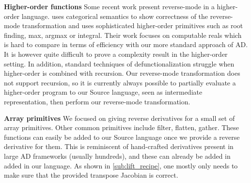 

\noindent \textbf{Higher-order functions}
Some recent work \cite{vakar2020reverse,sherman2021} present reverse-mode in a higher-order language.
\cite{vakar2020reverse} uses categorical semantics to show correctness of the reverse-mode transformation 
and \cite{sherman2021} uses sophisticated higher-order primitives such as root finding, max, argmax or integral. 
Their work focuses on computable reals which is hard to compare in terms of efficiency with our more standard approach of AD.
It is however quite difficult to prove a complexity result in the higher-order setting. 
In addition, standard techniques of defunctionalization struggle when higher-order is combined with recursion.
Our reverse-mode transformation does not support recursion, 
so it is currently always possible to partially evaluate a higher-order program to our Source language, seen as intermediate representation,
then perform our reverse-mode transformation.

\noindent \textbf{Array primitives}
We focused on giving reverse derivatives for a small set of array primitives. 
Other common primitives include filter, flatten, gather. 
These functions can easily be added to our Source language once we provide a reverse derivative for them.
This is reminiscent of hand-crafted derivatives present in large AD frameworks (usually hundreds), 
and these can already be added in added in our language. 
As shown in \ref{sub:lift_recipe}, one mostly only needs to make sure that the provided transpose Jacobian is correct.



